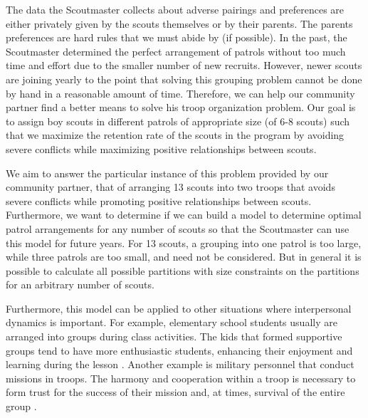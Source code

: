 \documentclass{amsart}
\theoremstyle{definition}
\theoremstyle{remark}
\numberwithin{equation}{section}
\begin{document}
The data the Scoutmaster collects about adverse pairings and preferences are either privately given by the scouts themselves or by their parents. The parents preferences are hard rules that we must abide by (if possible). In the past, the Scoutmaster determined the perfect arrangement of patrols without too much time and effort due to the smaller number of new recruits. However, newer scouts are joining yearly to the point that solving this grouping problem cannot be done by hand in a reasonable amount of time. Therefore, we can help our community partner find a better means to solve his troop organization problem. Our goal is to assign boy scouts in different patrols of appropriate size (of 6-8 scouts) such that we maximize the retention rate of the scouts in the program by avoiding severe conflicts while maximizing positive relationships between scouts.

We aim to answer the particular instance of this problem provided by our community partner, that of arranging 13 scouts into two troops that avoids severe conflicts while promoting positive relationships between scouts. Furthermore, we want to determine if we can build a model to determine optimal patrol arrangements for any number of scouts so that the Scoutmaster can use this model for future years. For 13 scouts, a grouping into one patrol is too large, while three patrols are too small, and need not be considered. But in general it is possible to calculate all possible partitions with size constraints on the partitions for an arbitrary number of scouts\cite{A}. 

Furthermore, this model can be applied to other situations where interpersonal dynamics is important. For example, elementary school students usually are arranged into groups during class activities. The kids that formed supportive groups tend to have more enthusiastic students, enhancing their enjoyment and learning during the lesson \cite{B}. Another example is military personnel that conduct missions in troops. The harmony and cooperation within a troop is necessary to form trust for the success of their mission and, at times, survival of the entire group \cite{C}. 
\end{document}
